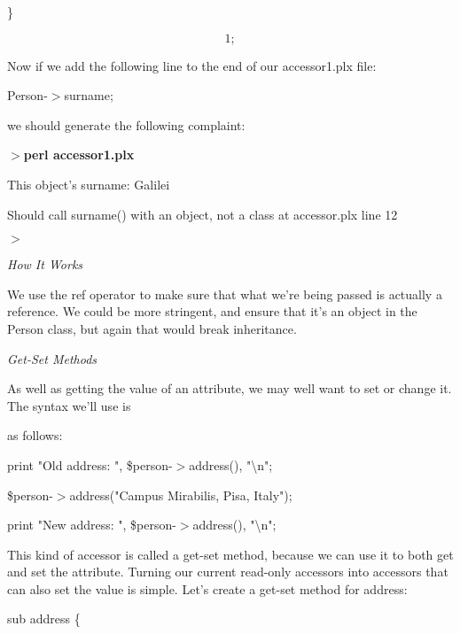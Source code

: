 \documentclass[a4paper,11pt]{book}
\begin{document}
\noindent \}

\noindent 

\[1;\] 


\noindent Now if we add the following line to the end of our accessor1.plx file:

\noindent 

\noindent 

\noindent Person-$>$surname;

\noindent 

\noindent we should generate the following complaint:

\noindent 

\noindent $>$\textbf{perl accessor1.plx}

\noindent This object's surname: Galilei

\noindent Should call surname() with an object, not a class at accessor.plx line 12

\noindent $>$

\noindent 

\noindent \textit{How It Works}

\noindent We use the ref operator to make sure that what we're being passed is actually a reference. We could be more stringent, and ensure that it's an object in the Person class, but again that would break inheritance.

\noindent 

\noindent \textit{Get-Set Methods}

\noindent As well as getting the value of an attribute, we may well want to set or change it. The syntax we'll use is

\noindent as follows:

\noindent 

\noindent 

\noindent print "Old address: ", \$person-$>$address(), "\textbackslash n";

\noindent \$person-$>$address("Campus Mirabilis, Pisa, Italy");

\noindent print "New address: ", \$person-$>$address(), "\textbackslash n";

\noindent 

\noindent This kind of accessor is called a get-set method, because we can use it to both get and set the attribute. Turning our current read-only accessors into accessors that can also set the value is simple. Let's create a get-set method for address:

\noindent 

\noindent sub address \{
\end{document}
